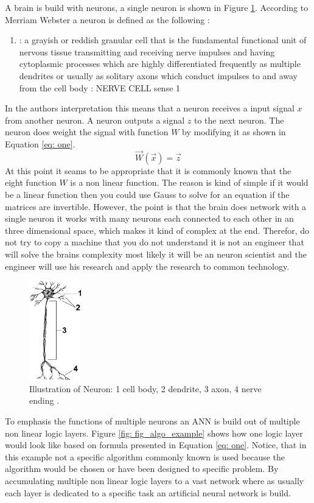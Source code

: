 \documentclass[conference]{IEEEtran}
\begin{document}
A brain is build with neurons, a single neuron is shown in Figure \ref{fig: neuron1}. According to Merriam Webster a neuron is defined as the following \cite{Neuron}:\\
\begin{enumerate}
	\item[] :  a grayish or reddish granular cell that is the fundamental functional unit of nervous tissue transmitting and receiving nerve impulses and having cytoplasmic processes which are highly differentiated frequently as multiple dendrites or usually as solitary axons which conduct impulses to and away from the cell body : NERVE CELL sense 1
\end{enumerate}
In the authors interpretation this means that a neuron receives a input signal $x$ from another neuron. A neuron outputs a signal $z$ to the next neuron. The neuron does weight the signal with function $W$ by modifying it as shown in Equation \ref{eq: one}.
\begin{equation}
\vec{W}(\vec{x})=\vec{z}\label{eq: one}
\end{equation}
At this point it seams to be appropriate that it is commonly known that the eight function $W$ is a non linear function. The reason is kind of simple if it would be a linear function then you could use Gauss to solve for an equation if the matrices are invertible. However, the point is that the brain does network with a single neuron it works with many neurons each connected to each other in an three dimensional space, which makes it kind of complex at the end.
Therefor, do not try to copy a machine that you do not understand it is not an engineer that will solve the brains complexity most likely it will be an neuron scientist and the engineer will use his research and apply the research to common technology.
\begin{figure}[htbp]
\centerline{\includegraphics[width=0.2\textwidth]{01_images/neuron1.PNG}}
\caption{Illustration of Neuron: 1 cell body, 2 dendrite, 3 axon, 4 nerve ending \cite{Neuron}.}
\label{fig: neuron1}
\end{figure}
To emphasis the functions of multiple neurons an ANN is build out of multiple non linear  logic layers. Figure \ref{fig: fig_algo_example} shows how one logic layer would look like based on formula presented in Equation \ref{eq: one}. Notice, that in this example not a specific algorithm commonly known is used because the algorithm would be chosen or have been designed to specific problem. By accumulating multiple non linear logic layers to a vast network where as usually each layer is dedicated to a specific task an artificial neural network is build.
\end{document}
